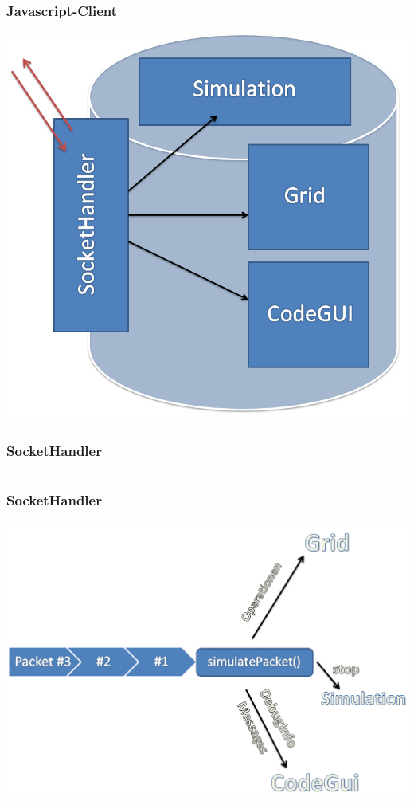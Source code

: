 \begin{frame}
\frametitle{Javascript-Client}
\begin{center}
	\includegraphics[scale=0.3]{client/modules.png}
\end{center}
\end{frame}


\begin{frame}
\frametitle{SocketHandler}
\inputminted[linenos, numbersep=2pt, tabsize=4, frame=lines, label=Beispiel Paket]{json}{client/packet.json}
\end{frame}

\begin{frame}
\frametitle{SocketHandler}
	\includegraphics[scale=0.37]{client/socket-queue.PNG}
\end{frame}

